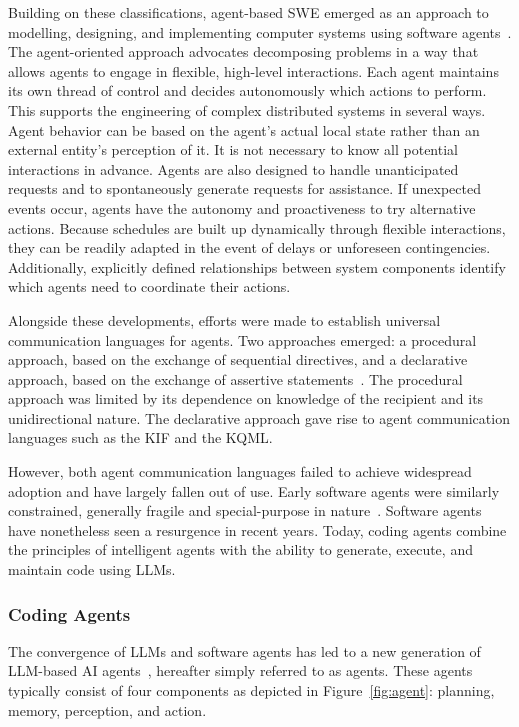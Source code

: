 \documentclass[
english,                 %
bibtex,                  %
]{kththesis}
\numberwithin{listing}{chapter}
\begin{document}
Building on these classifications, agent-based \gls{SWE} emerged as an approach to modelling, designing, and implementing computer systems using software agents~\cite{jennings_agent-based_2000}. The agent-oriented approach advocates decomposing problems in a way that allows agents to engage in flexible, high-level interactions. Each agent maintains its own thread of control and decides autonomously which actions to perform. This supports the engineering of complex distributed systems in several ways. Agent behavior can be based on the agent's actual local state rather than an external entity's perception of it. It is not necessary to know all potential interactions in advance. Agents are also designed to handle unanticipated requests and to spontaneously generate requests for assistance. If unexpected events occur, agents have the autonomy and proactiveness to try alternative actions. Because schedules are built up dynamically through flexible interactions, they can be readily adapted in the event of delays or unforeseen contingencies. Additionally, explicitly defined relationships between system components identify which agents need to coordinate their actions.

Alongside these developments, efforts were made to establish universal communication languages for agents. Two approaches emerged: a procedural approach, based on the exchange of sequential directives, and a declarative approach, based on the exchange of assertive statements~\cite{genesereth_software_1994}. The procedural approach was limited by its dependence on knowledge of the recipient and its unidirectional nature. The declarative approach gave rise to agent communication languages such as the \gls{KIF} and the \gls{KQML}.

However, both agent communication languages failed to achieve widespread adoption and have largely fallen out of use. Early software agents were similarly constrained, generally fragile and special-purpose in nature~\cite{bradshaw_introduction_1997}. Software agents have nonetheless seen a resurgence in recent years. Today, coding agents combine the principles of intelligent agents with the ability to generate, execute, and maintain code using \glspl{LLM}.

\subsubsection{Coding Agents}
\label{sec:bg_coding_agents}

The convergence of \glspl{LLM} and software agents has led to a new generation of \gls{LLM}-based \gls{AI} agents~\cite{wang_survey_2024}, hereafter simply referred to as agents. These agents typically consist of four components as depicted in Figure~\ref{fig:agent}: planning, memory, perception, and action.
\end{document}
